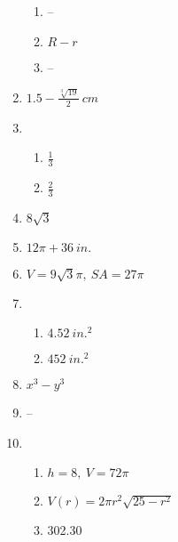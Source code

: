 \documentclass{article}
\begin{document}
\begin{enumerate}
	\begin{enumerate}
	
	\item --
	
	\item $R - r$
	
	\item --
	
	\end{enumerate}
	
\item $1.5 - \frac{\sqrt[3]{19}}{2} \ cm$

\item 

	\begin{enumerate}
	
	\item $\frac{1}{3}$
	
	\item $\frac{2}{3}$
	
	\end{enumerate}
	
\item $8 \sqrt{3}$

\item $12 \pi + 36 \ in.$

\item $V = 9 \sqrt{3} \pi, \ SA = 27 \pi$

\item 

	\begin{enumerate}
	
	\item $4.52 \ in.^2$
	
	\item $452 \ in.^2$
	
	\end{enumerate}
	
\item $x^3 - y^3$

\item --
	
\item

	\begin{enumerate}
	
	\item $h = 8, \ V = 72 \pi$
	
	\item $V(r) = 2 \pi r^2 \sqrt{25 - r^2}$
	
	\item 302.30
	

\end{enumerate}
\end{enumerate}
\end{document}
